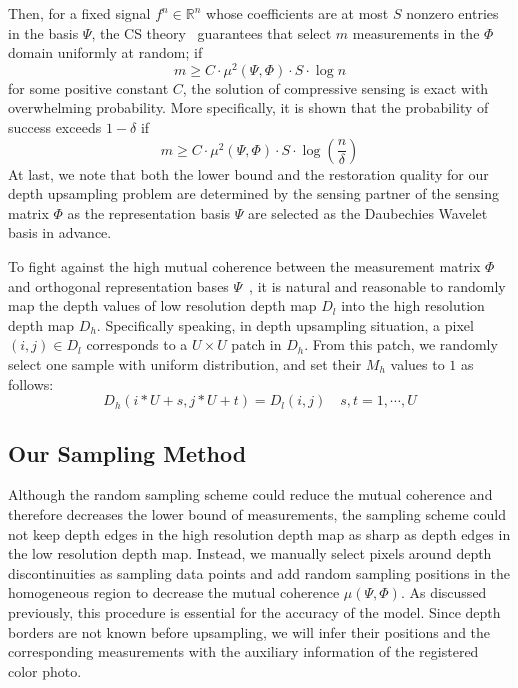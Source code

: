\documentclass[preprint,10pt,5p,times,twocolumn]{elsarticle}
\begin{document}
Then, for a fixed signal $f^n \in \mathbb{R}^n$ whose coefficients are at most $S$ nonzero entries in the basis $\Psi$, the CS theory~\cite{CW08} guarantees that select $m$ measurements in the $\Phi$ domain uniformly at random; if
\begin{equation}
m \geq C \cdot \mu^2(\Psi, \Phi) \cdot S \cdot \log n
\label{eq:prob1}
\end{equation}
for some positive constant $C$, the solution of compressive sensing is exact with
overwhelming probability. More specifically, it is shown that the probability of success exceeds $1 - \delta$ if
\begin{equation}
m \geq C \cdot \mu^2(\Psi, \Phi) \cdot S \cdot \log(\frac{n}{\delta})
\label{eq:prob2}
\end{equation}
At last, we note that both the lower bound and the restoration quality for  our depth upsampling problem are determined by the sensing partner of the sensing matrix $\Phi$ as the representation basis $\Psi$ are selected as the Daubechies Wavelet basis in advance.

To fight against the high mutual coherence between the measurement matrix $\Phi$ and orthogonal representation bases $\Psi$~\cite{DH01}, it is natural and reasonable to randomly map the depth values of low resolution depth map $D_{l}$ into the high resolution depth map $D_{h}$. Specifically speaking, in depth upsampling situation, a pixel $(i,j)\in D_{l}$ corresponds to a $U\times U$ patch in $D_{h}$. From this patch, we randomly select one sample with uniform distribution, and set their $M_{h}$ values to $1$ as follows:
\begin{equation}
D_{h}(i*U+s,j*U+t)=D_{l}(i,j) \quad s,t=1,\cdots,U
\label{eq:random}
\end{equation}


\subsection{Our Sampling Method}
\label{sec:sampling_method}

Although the random sampling scheme could reduce the mutual coherence and therefore decreases the lower bound of measurements, the sampling scheme could not keep depth edges in the high resolution depth map as sharp as depth edges in the low resolution depth map. Instead, we manually select pixels around depth discontinuities as sampling data points and add random sampling positions in the homogeneous region to decrease the mutual coherence $\mu(\Psi, \Phi)$. As discussed previously, this procedure is essential for the accuracy of the model. Since depth borders are not known before upsampling, we will infer their positions and the corresponding measurements with the auxiliary information of the registered color photo.
\end{document}
